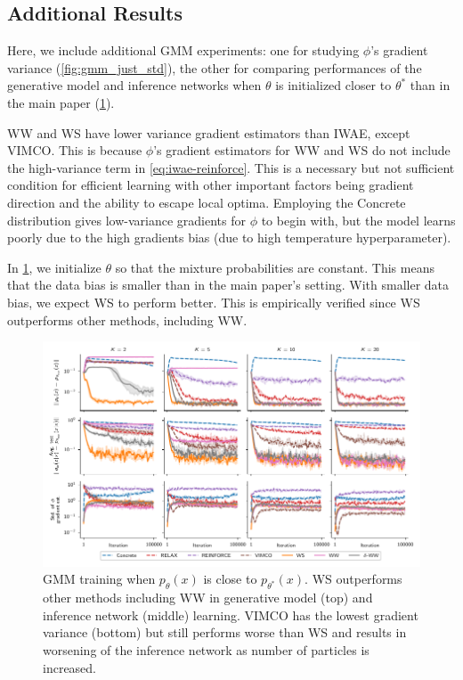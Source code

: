 \subsection{Additional Results}
\label{app:gmm/additional}

Here, we include additional \gls{GMM} experiments:
one for studying $\phi$'s gradient variance (\cref{fig:gmm_just_std}),
the other for comparing performances of the generative model and inference networks when $\theta$ is initialized closer to $\theta^*$ than in the main paper (\cref{fig:gmm_init_near}).

\Gls{WW} and \gls{WS} have lower variance gradient estimators than \gls{IWAE}, except \gls{VIMCO}.
This is because $\phi$'s gradient estimators for \gls{WW} and \gls{WS} do not include the high-variance term  in \cref{eq:iwae-reinforce}.
This is a necessary but not sufficient condition for efficient learning with other important factors being gradient direction and the ability to escape local optima.
Employing the Concrete distribution gives low-variance gradients for $\phi$ to begin with, but the model learns poorly due to the high gradients bias (due to high temperature hyperparameter).

In \cref{fig:gmm_init_near}, we initialize $\theta$ so that the mixture probabilities are constant.
This means that the data bias is smaller than in the main paper's setting.
With smaller data bias, we expect \gls{WS} to perform better.
This is empirically verified since \gls{WS} outperforms other methods, including \gls{WW}.


\begin{figure}[!ht]
  \centering
  \includegraphics[width=\textwidth]{figures/RRWS/gmm/errors_near.pdf}
  \vspace*{-4ex}
  \caption{
    \Gls{GMM} training when $p_\theta(x)$ is close to $p_{\theta^*}(x)$.
    \Gls{WS} outperforms other methods including \gls{WW} in generative model (top) and inference network (middle) learning.
    \Gls{VIMCO} has the lowest gradient variance (bottom) but still performs worse than \gls{WS} and results in worsening of the inference network as number of particles is increased.
  }
  \label{fig:gmm_init_near}
  \vspace*{-2ex}
\end{figure}

